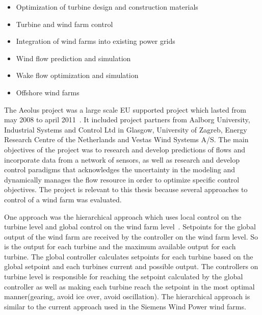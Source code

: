 \begin{itemize}
	\item Optimization of turbine design and construction materials
	\item Turbine and wind farm control
	\item Integration of wind farms into existing power grids
	\item Wind flow prediction and simulation
	\item Wake flow optimization and simulation
	\item Offshore wind farms
\end{itemize}

%

The Aeolus project was a large scale EU supported project which lasted from may 2008 to april 2011~\cite{Aoelus}. It included project partners from 
Aalborg University, Industrial Systems and Control Ltd in Glasgow, University of Zagreb, Energy Research Centre of the Netherlands and Vestas Wind Systems A/S.
The main objectives of the project was to research and develop predictions of flows and incorporate data from a network of sensors, as well as research and develop control paradigms that acknowledges the uncertainty in the modeling and dynamically manages the flow resource in order to optimize specific control objectives.
The project is relevant to this thesis because several approaches to control of a wind farm was evaluated.

One approach was the hierarchical approach which uses local control on the turbine level and global control on the wind farm level~\cite{HeirarchicalWindFarmControl}.
Setpoints for the global output of the wind farm are received by the controller on the wind farm level.
So is the output for each turbine and the maximum available output for each turbine.
The global controller calculates setpoints for each turbine based on the global setpoint and each turbines current and possible output.
The controllers on turbine level is responsible for reaching the setpoint calculated by the global controller as well as making each turbine reach the setpoint in the most optimal manner(gearing, avoid ice over, avoid oscillation).
The hierarchical approach is similar to the current approach used in the Siemens Wind Power wind farms.

